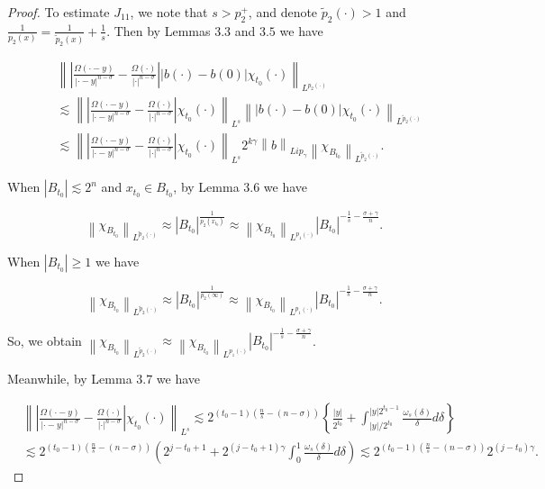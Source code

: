 \documentclass[oneside,reqno]{amsart}
\numberwithin{equation}{section}
\theoremstyle{definition}
\begin{document}
\begin{proof}
To estimate $J_{11}$, we note that $s>p_{2}^{+}$, and denote $\tilde{p}_{2}(\cdot)>1$ and $\frac{1}{p_{2}(x)}=\frac{1}{\tilde{p}_{2}(x)}+\frac{1}{s}$. Then by Lemmas $3.3$ and $3.5$ we have

$$
\begin{aligned}
& \left\|\left|\frac{\Omega(\cdot-y)}{\left| \cdot-y\right|^{n-\sigma}}-\frac{\Omega(\cdot)}{|\cdot|^{n-\sigma}}\right|\left|b(\cdot)-b(0)\right| \chi_{t_0}(\cdot)\right\|_{L^{p_{2}(\cdot)}} \\
& \lesssim\left\|\left|\frac{\Omega(\cdot-y)}{\left| \cdot-y\right|^{n-\sigma}}-\frac{\Omega(\cdot)}{|\cdot| ^{n-\sigma}}\right| \chi_{t_0}(\cdot)\right\|_{L^{s}}\left\|\left|b(\cdot)-b(0)\right| \chi_{t_0}(\cdot) \right\|_{L^{\tilde{p}_{2}(\cdot)}} \\
& \lesssim \left\|\left|\frac{\Omega(\cdot-y)}{\left| \cdot-y\right|^{n-\sigma}}-\frac{\Omega(\cdot)}{|\cdot| ^{n-\sigma}}\right| \chi_{t_0}(\cdot)\right\|_{L^{s}}2^{k\gamma}\left\| b\right\|_{Lip_\gamma}\left\| \chi_{B_{t_0}} \right\|_{L^{\tilde{p}_{2}(\cdot)}} .
\end{aligned}
$$

When $\left|B_{t_0}\right| \lesssim 2^{n}$ and $x_{t_0} \in B_{t_0}$, by Lemma $3.6$ we have

$$
\left\|\chi_{B_{t_0}}\right\|_{L^{\tilde{p}_{2}(\cdot)}} \approx\left|B_{t_0}\right|^{\frac{1}{p_{2}\left(x_{t_0}\right)}} \approx\left\|\chi_{B_{t_0}}\right\|_{L^{p_{1}(\cdot)}}\left|B_{t_0}\right|^{-\frac{1}{s}-\frac{\sigma+\gamma}{n}}.
$$

When $\left|B_{t_0}\right| \geq 1$ we have

$$
\left\|\chi_{B_{t_0}}\right\|_{L^{\tilde{p}_{2}(\cdot)}} \approx\left|B_{t_0} \right|^{\frac{1}{p_{2}(\infty)}} \approx\left\|\chi_{B_{t_0}}\right\|_{L^{p_{1}(\cdot)}}\left| B_{t_0}\right|^{-\frac{1}{s}-\frac{\sigma+\gamma}{n}}.
$$

So, we obtain $\left\|\chi_{B_{t_0}}\right\|_{L^{\tilde{p}_{2}(\cdot)}} \approx\left\|\chi_{B_{t_0}}\right\|_{L^{p_{1}(\cdot)}}\left|B_{t_0}\right|^{-\frac{1}{s}-\frac{\sigma+\gamma}{n}}$.

Meanwhile, by Lemma $3.7$ we have

$$
\begin{aligned}
&\left\|\left|\frac{\Omega(\cdot-y)}{\left| \cdot-y\right|^{n-\sigma}}-\frac{\Omega(\cdot)}{|\cdot| ^{n-\sigma}}\right| \chi_{t_0}(\cdot)\right\|_{L^{s}} \lesssim 2^{(t_0-1)\left(\frac{n}{s}-(n-\sigma)\right)}\left\{\frac{|y|}{2^{t_0}}+\int_{|y| / 2^{t_0}}^{|y| 2^{t_0-1}} \frac{\omega_{s}(\delta)}{\delta} d \delta\right\} \\
& \lesssim 2^{(t_0-1)\left(\frac{n}{s}-(n-\sigma)\right)}\left(2^{j-t_0+1}+2^{(j-t_0+1) \gamma} \int_{0}^{1} \frac{\omega_{s}(\delta)}{\delta} d \delta\right) \lesssim  2^{(t_0-1)\left(\frac{n}{s}-(n-\sigma)\right)} 2^{(j-t_0) \gamma}.
\end{aligned}
$$


\end{proof}
\end{document}
